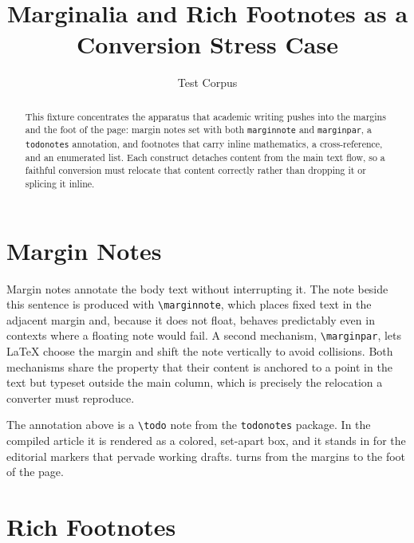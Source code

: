 \documentclass[11pt]{article}
\title{Marginalia and Rich Footnotes as a Conversion Stress Case}
\author{Test Corpus}
\date{}
\begin{document}
\maketitle

\begin{abstract}
This fixture concentrates the apparatus that academic writing pushes into the
margins and the foot of the page: margin notes set with both \texttt{marginnote}
and \texttt{marginpar}, a \texttt{todonotes} annotation, and footnotes that carry
inline mathematics, a cross-reference, and an enumerated list. Each construct
detaches content from the main text flow, so a faithful conversion must relocate
that content correctly rather than dropping it or splicing it inline.
\end{abstract}

\section{Margin Notes}
\label{sec:margins}

Margin notes annotate the body text without interrupting it. The note beside this sentence is produced with
\verb|\marginnote|, which places fixed text in the adjacent margin and, because it
does not float, behaves predictably even in contexts where a floating note would
fail. A second mechanism, \verb|\marginpar|, lets \LaTeX{} choose the margin and
shift the note vertically to avoid collisions. Both mechanisms
share the property that their content is anchored to a point in the text but
typeset outside the main column, which is precisely the relocation a converter
must reproduce.


The annotation above is a \verb|\todo| note from the \texttt{todonotes} package.
In the compiled article it is rendered as a colored, set-apart box, and it stands
in for the editorial markers that pervade working drafts. 
turns from the margins to the foot of the page.

\section{Rich Footnotes}
\label{sec:footnotes}
\end{document}
